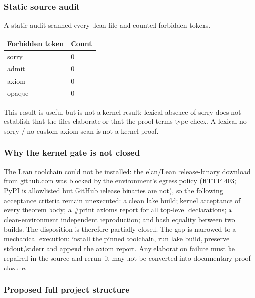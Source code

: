 \hypertarget{static-source-audit}{%
\subsubsection{Static source audit}\label{static-source-audit}}

A static audit scanned every .lean file and counted forbidden tokens.

\begin{longtable}[]{@{}ll@{}}
\toprule\noalign{}
Forbidden token & Count \\
\midrule\noalign{}
\endhead
\bottomrule\noalign{}
\endlastfoot
sorry & 0 \\
admit & 0 \\
axiom & 0 \\
opaque & 0 \\
\end{longtable}

This result is useful but is not a kernel result: lexical absence of
sorry does not establish that the files elaborate or that the proof
terms type-check. A lexical no-sorry / no-custom-axiom scan is not a
kernel proof.

\hypertarget{why-the-kernel-gate-is-not-closed}{%
\subsubsection{Why the kernel gate is not
closed}\label{why-the-kernel-gate-is-not-closed}}

The Lean toolchain could not be installed: the elan/Lean release-binary
download from github.com was blocked by the environment's egress policy
(HTTP 403; PyPI is allowlisted but GitHub release binaries are not), so
the following acceptance criteria remain unexecuted: a clean lake build;
kernel acceptance of every theorem body; a \#print axioms report for all
top-level declarations; a clean-environment independent reproduction;
and hash equality between two builds. The disposition is therefore
partially closed. The gap is narrowed to a mechanical execution: install
the pinned toolchain, run lake build, preserve stdout/stderr and append
the axiom report. Any elaboration failure must be repaired in the source
and rerun; it may not be converted into documentary proof closure.

\hypertarget{proposed-full-project-structure}{%
\subsubsection{Proposed full project
structure}\label{proposed-full-project-structure}}

